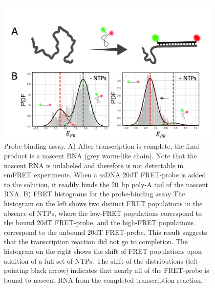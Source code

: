 \begin{figure}
    \centering
    \includegraphics[width=\textwidth]{chapters/figures/probe_binding_assay.jpg}
    \caption{\label{fig:probe-binding_assay} 
    Probe-binding assay.
    A) After transcription is complete, the final product is a nascent RNA (grey worm-like chain). Note that the nascent RNA is unlabeled and therefore is not detectable in \ac{smFRET} experiments. 
    When a \ac{ssDNA} 20dT FRET-probe is added to the solution, it readily binds the 20~\ac{bp} poly-A tail of the nascent RNA. 
    B) FRET histograms for the probe-binding assay
    The histogram on the left shows two distinct FRET populations in the absence of \ac{NTP}s, where the low-FRET populations correspond to the bound 20dT FRET-probe, and the high-FRET populations correspond to the unbound 20dT FRET-probe. 
    This result suggests that the transcription reaction did not go to completion. 
    The histogram on the right shows the shift of FRET populations upon addition of a full set of \ac{NTP}s. 
    The shift of the distributions (left-pointing black arrow) indicates that nearly all of the FRET-probe is bound to nascent RNA from the completed transcription reaction.
    }
\end{figure}

